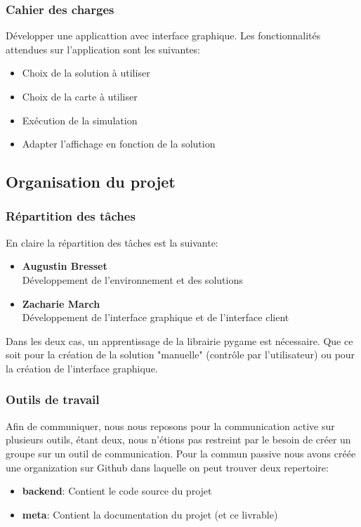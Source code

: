 \documentclass[french,a4paper,10pt,twocolumn]{article}
\begin{document}
\subsubsection{Cahier des charges}

Développer une applicattion avec interface graphique. Les fonctionnalités attendues sur l'application sont les suivantes:
\begin{itemize}
    \item Choix de la solution à utiliser
    \item Choix de la carte à utiliser
    \item Exécution de la simulation
    \item Adapter l'affichage en fonction de la solution
\end{itemize}

\subsection{Organisation du projet}

\subsubsection{Répartition des tâches}

En claire la répartition des tâches est la suivante:
\begin{itemize}
    \item \textbf{Augustin Bresset}\\
        Développement de l'environnement et des solutions 
    \item \textbf{Zacharie March}\\
        Développement de l'interface graphique et de l'interface client
\end{itemize}
Dans les deux cas, un apprentissage de la librairie pygame est nécessaire. Que ce soit pour la création de la solution "manuelle" (contrôle par l'utilisateur)
ou pour la création de l'interface graphique.

\subsubsection{Outils de travail}

Afin de communiquer, nous nous reposons pour la communication active sur plusieurs outils, étant deux,
nous n'étions pas restreint par le besoin de créer un groupe sur un outil de communication.
Pour la commun passive nous avons créée une organization sur Github dans laquelle on peut trouver deux repertoire:
\begin{itemize}
    \item \textbf{backend}: Contient le code source du projet
    \item \textbf{meta}: Contient la documentation du projet (et ce livrable)
\end{itemize}
\end{document}
